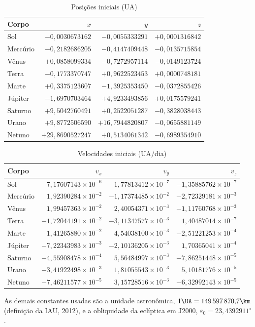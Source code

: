 \begin{table}[htb]
  \centering
  \caption{Posições iniciais (UA)}
  \label{tab:pos}
  \small
  \begin{tabular}{lrrr}
    \toprule
    Corpo & $x$ & $y$ & $z$ \\
    \midrule
    Sol & $-0{,}0030673162$ & $-0{,}0055333291$ & $+0{,}0001316842$ \\
Mercúrio & $-0{,}2182686205$ & $-0{,}4147409448$ & $-0{,}0135715854$ \\
Vênus & $+0{,}0858099334$ & $-0{,}7272957114$ & $-0{,}0149123724$ \\
Terra & $-0{,}1773370747$ & $+0{,}9622523453$ & $+0{,}0000748181$ \\
Marte & $+0{,}3375123607$ & $-1{,}3925353450$ & $-0{,}0372855426$ \\
Júpiter & $-1{,}6970703464$ & $+4{,}9233493856$ & $+0{,}0175579241$ \\
Saturno & $+9{,}5042760491$ & $+0{,}2522051287$ & $-0{,}3828038443$ \\
Urano & $+9{,}8772506590$ & $+16{,}7944820807$ & $-0{,}0655881149$ \\
Netuno & $+29{,}8690527247$ & $+0{,}5134061342$ & $-0{,}6989354910$ \\
    \bottomrule
  \end{tabular}
\end{table}

\begin{table}[htb]
  \centering
  \caption{Velocidades iniciais (UA/dia)}
  \label{tab:vel}
  \small
  \begin{tabular}{lrrr}
    \toprule
    Corpo & $v_x$ & $v_y$ & $v_z$ \\
    \midrule
    Sol & $7{,}17607143\times10^{-6}$ & $1{,}77813412\times10^{-7}$ & $-1{,}35885762\times10^{-7}$ \\
Mercúrio & $1{,}92390284\times10^{-2}$ & $-1{,}17374485\times10^{-2}$ & $-2{,}72329181\times10^{-3}$ \\
Vênus & $1{,}99457363\times10^{-2}$ & $2{,}40054371\times10^{-3}$ & $-1{,}11760768\times10^{-3}$ \\
Terra & $-1{,}72044191\times10^{-2}$ & $-3{,}11347577\times10^{-3}$ & $1{,}40487014\times10^{-7}$ \\
Marte & $1{,}41265880\times10^{-2}$ & $4{,}54038100\times10^{-3}$ & $-2{,}51221253\times10^{-4}$ \\
Júpiter & $-7{,}22343983\times10^{-3}$ & $-2{,}10136205\times10^{-3}$ & $1{,}70365041\times10^{-4}$ \\
Saturno & $-4{,}55908478\times10^{-4}$ & $5{,}56484997\times10^{-3}$ & $-7{,}86251448\times10^{-5}$ \\
Urano & $-3{,}41922498\times10^{-3}$ & $1{,}81055543\times10^{-3}$ & $5{,}10181776\times10^{-5}$ \\
Netuno & $-7{,}46211577\times10^{-5}$ & $3{,}15728516\times10^{-3}$ & $-6{,}32992143\times10^{-5}$ \\
    \bottomrule
  \end{tabular}
\end{table}

As demais constantes usadas são a unidade astronômica, $1\UA = 149\,597\,870{,}7\km$ (definição da IAU, 2012), e a obliquidade da eclíptica em J2000, $\varepsilon_0 = 23{,}4392911^\circ$.
